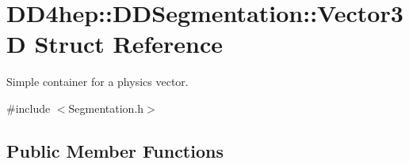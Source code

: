 \hypertarget{struct_d_d4hep_1_1_d_d_segmentation_1_1_vector3_d}{}\section{D\+D4hep\+:\+:D\+D\+Segmentation\+:\+:Vector3D Struct Reference}
\label{struct_d_d4hep_1_1_d_d_segmentation_1_1_vector3_d}


Simple container for a physics vector.  




{\ttfamily \#include $<$Segmentation.\+h$>$}

\subsection*{Public Member Functions}
